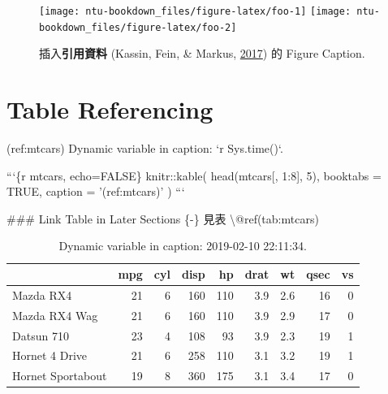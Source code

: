 \documentclass[oneside]{book}
\newenvironment{Shaded}{\begin{snugshade}}{\end{snugshade}}
\newcommand{\BaseNTok}[1]{\textcolor[rgb]{0.00,0.00,0.81}{#1}}
\newcommand{\FunctionTok}[1]{\textcolor[rgb]{0.00,0.00,0.00}{#1}}
\newcommand{\NormalTok}[1]{#1}
\theoremstyle{definition}
\theoremstyle{definition}
\theoremstyle{definition}
\theoremstyle{remark}
\begin{document}
\begin{figure}

{\centering \texttt{[image: ntu-bookdown\_files/figure-latex/foo-1]} \texttt{[image: ntu-bookdown\_files/figure-latex/foo-2]} 

}

\caption{插入\textbf{引用資料} (Kassin, Fein, \& Markus, \protect\hyperlink{ref-kassin2017}{2017}) 的 Figure Caption.}\label{fig:foo}
\end{figure}

\hypertarget{table-referencing}{%
\section{Table Referencing}\label{table-referencing}}

\begin{Shaded}
\begin{Highlighting}[]
\NormalTok{(ref:mtcars) Dynamic variable in caption: }\BaseNTok{`r Sys.time()`}\NormalTok{.}

\BaseNTok{```\{r mtcars, echo=FALSE\}}
\BaseNTok{knitr::kable(}
\BaseNTok{  head(mtcars[, 1:8], 5), booktabs = TRUE,}
\BaseNTok{  caption = '(ref:mtcars)'}
\BaseNTok{  )}
\BaseNTok{```}

\FunctionTok{### Link Table in Later Sections \{-\}}
\NormalTok{見表 \textbackslash{}@ref(tab:mtcars)}
\end{Highlighting}
\end{Shaded}



\begin{table}[t]

\caption{\label{tab:mtcar}Dynamic variable in caption: 2019-02-10 22:11:34.}
\centering
\begin{tabular}{lrrrrrrrr}
\toprule
  & mpg & cyl & disp & hp & drat & wt & qsec & vs\\
\midrule
Mazda RX4 & 21 & 6 & 160 & 110 & 3.9 & 2.6 & 16 & 0\\
Mazda RX4 Wag & 21 & 6 & 160 & 110 & 3.9 & 2.9 & 17 & 0\\
Datsun 710 & 23 & 4 & 108 & 93 & 3.9 & 2.3 & 19 & 1\\
Hornet 4 Drive & 21 & 6 & 258 & 110 & 3.1 & 3.2 & 19 & 1\\
Hornet Sportabout & 19 & 8 & 360 & 175 & 3.1 & 3.4 & 17 & 0\\
\bottomrule
\end{tabular}
\end{table}
\end{document}
